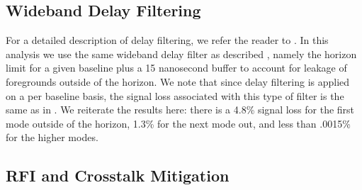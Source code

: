 \documentclass[twocolumn,numberedappendix]{emulateapj} \shorttitle{PSA64}
\begin{document}
%
%



\subsection{Wideband Delay Filtering}\label{sec:wbd_filtering}

For a detailed description of delay filtering, we refer the reader to
\cite{parsons_backer2009}. In this analysis we use the same wideband delay
filter as described \cite{parsons_et_al2014a}, namely the horizon limit for a
given baseline plus a 15 nanosecond buffer to account for leakage of foregrounds
outside of the horizon. We note that since delay filtering is applied on a per
baseline basis, the signal loss associated with this type of filter is the same
as in \cite{parsons_et_al2014a}. We reiterate the results here: there is a 4.8\%
signal loss for the first mode outside of the horizon, 1.3\% for the next mode
out, and less than .0015\% for the higher modes.


\subsection{RFI and Crosstalk Mitigation}\label{sec:rfi}
\end{document}
